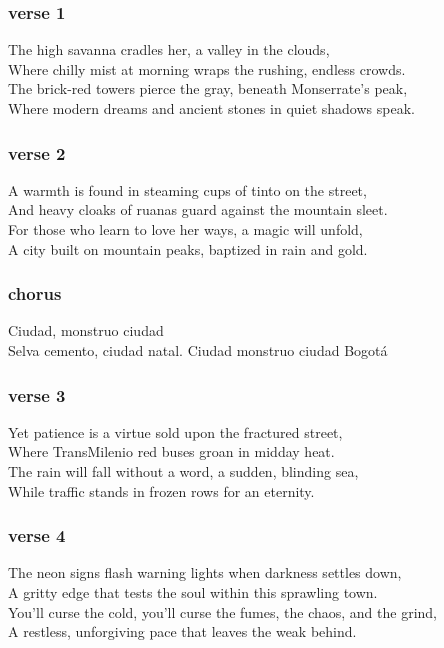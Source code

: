\subsubsection{verse 1}\label{verse-1-6}

The high savanna cradles her, a valley in the clouds,\\
Where chilly mist at morning wraps the rushing, endless crowds.\\
The brick-red towers pierce the gray, beneath Monserrate's peak,\\
Where modern dreams and ancient stones in quiet shadows speak.

\subsubsection{verse 2}\label{verse-2-7}

A warmth is found in steaming cups of tinto on the street,\\
And heavy cloaks of ruanas guard against the mountain sleet.\\
For those who learn to love her ways, a magic will unfold,\\
A city built on mountain peaks, baptized in rain and gold.

\subsubsection{chorus}\label{chorus-15}

Ciudad, monstruo ciudad\\
Selva cemento, ciudad natal. Ciudad monstruo ciudad Bogotá

\subsubsection{verse 3}\label{verse-3-4}

Yet patience is a virtue sold upon the fractured street,\\
Where TransMilenio red buses groan in midday heat.\\
The rain will fall without a word, a sudden, blinding sea,\\
While traffic stands in frozen rows for an eternity.

\subsubsection{verse 4}\label{verse-4-2}

The neon signs flash warning lights when darkness settles down,\\
A gritty edge that tests the soul within this sprawling town.\\
You'll curse the cold, you'll curse the fumes, the chaos, and the
grind,\\
A restless, unforgiving pace that leaves the weak behind.

